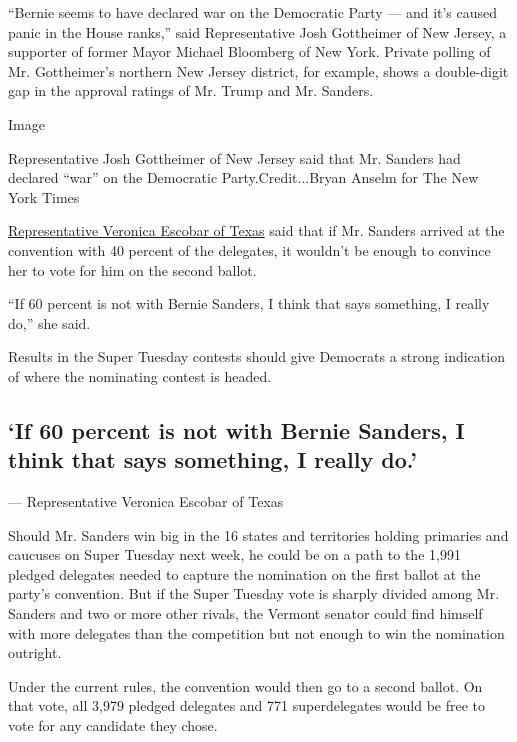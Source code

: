 ``Bernie seems to have declared war on the Democratic Party --- and it's
caused panic in the House ranks,'' said Representative Josh Gottheimer
of New Jersey, a supporter of former Mayor Michael Bloomberg of New
York. Private polling of Mr. Gottheimer's northern New Jersey district,
for example, shows a double-digit gap in the approval ratings of Mr.
Trump and Mr. Sanders.

Image

Representative Josh Gottheimer of New Jersey said that Mr. Sanders had
declared ``war'' on the Democratic Party.Credit...Bryan Anselm for The
New York Times

\href{https://www.nytimes3xbfgragh.onion/2019/07/11/us/politics/veronica-escobar-border-debate.html}{Representative
Veronica Escobar of Texas} said that if Mr. Sanders arrived at the
convention with 40 percent of the delegates, it wouldn't be enough to
convince her to vote for him on the second ballot.

``If 60 percent is not with Bernie Sanders, I think that says something,
I really do,'' she said.

Results in the Super Tuesday contests should give Democrats a strong
indication of where the nominating contest is headed.

\hypertarget{if-60-percent-is-not-with-bernie-sanders-i-think-that-says-something-i-really-do}{%
\subsection{`If 60 percent is not with Bernie Sanders, I think that says
something, I really
do.'}\label{if-60-percent-is-not-with-bernie-sanders-i-think-that-says-something-i-really-do}}

--- Representative Veronica Escobar of Texas

Should Mr. Sanders win big in the 16 states and territories holding
primaries and caucuses on Super Tuesday next week, he could be on a path
to the 1,991 pledged delegates needed to capture the nomination on the
first ballot at the party's convention. But if the Super Tuesday vote is
sharply divided among Mr. Sanders and two or more other rivals, the
Vermont senator could find himself with more delegates than the
competition but not enough to win the nomination outright.

Under the current rules, the convention would then go to a second
ballot. On that vote, all 3,979 pledged delegates and 771 superdelegates
would be free to vote for any candidate they chose.


